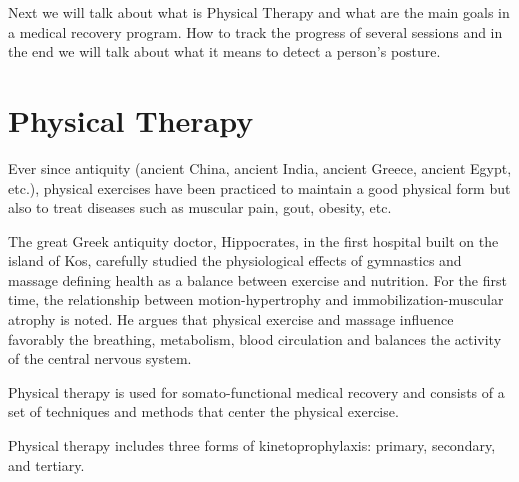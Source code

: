 Next we will talk about what is Physical Therapy and what are the main goals in a medical recovery program.
How to track the progress of several sessions and 
in the end we will talk about what it means to detect a person's posture.

\section{Physical Therapy}

Ever since antiquity (ancient China, ancient India, ancient Greece, ancient Egypt, etc.), 
physical exercises have been practiced to maintain a good physical
form but also to treat diseases such as muscular pain, gout, obesity, etc.


The great Greek antiquity doctor, Hippocrates, in the first hospital built on the island of Kos, 
carefully studied the physiological effects of gymnastics and massage defining health as a
 balance between exercise and nutrition. For the first time, the relationship between motion-hypertrophy and 
 immobilization-muscular atrophy is noted. He argues that physical exercise and massage influence favorably 
 the breathing, metabolism, blood circulation and balances the activity of the central nervous system. \cite{book.history.rehab.1991}


 Physical therapy is used for somato-functional medical recovery and 
 consists of a set of techniques and methods that center the physical exercise.

 Physical therapy includes three forms of kinetoprophylaxis: primary, secondary, and tertiary.

